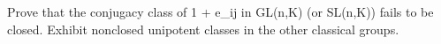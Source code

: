 Prove that the conjugacy class of 1 + e_{ij} in GL(n,K) (or SL(n,K)) fails to be closed. Exhibit nonclosed unipotent classes in the other classical groups.
